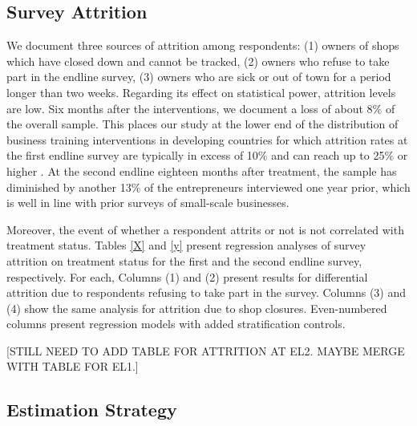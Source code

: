 \documentclass[11.5pt]{article}
\begin{document}
\subsection{Survey Attrition}

We document three sources of attrition among respondents: (1) owners of shops which have closed down and cannot be tracked, (2) owners who refuse to take part in the endline survey, (3) owners who are sick or out of town for a period longer than two weeks. Regarding its effect on statistical power, attrition levels are low. Six months after the interventions, we document a loss of about 8\% of the overall sample. This places our study at the lower end of the distribution of business training interventions in developing countries for which attrition rates at the first endline survey are typically in excess of 10\% and can reach up to 25\% or higher \citep[for a review, see][]{McKenzie2014}. At the second endline eighteen months after treatment, the sample has diminished by another 13\% of the entrepreneurs interviewed one year prior, which is well in line with prior surveys of small-scale businesses. %

Moreover, the event of whether a respondent attrits or not is not correlated with treatment status. Tables \ref{X} and \ref{y} present regression analyses of survey attrition on treatment status for the first and the second endline survey, respectively. For each, Columns (1) and (2) present results for differential attrition due to respondents refusing to take part in the survey. Columns (3) and (4) show the same analysis for attrition due to shop closures. Even-numbered columns present regression models with added stratification controls.

[\textcolor[rgb]{0.00,0.00,0.00}{STILL NEED TO ADD TABLE FOR ATTRITION AT EL2. MAYBE MERGE WITH TABLE FOR EL1.}]

\subsection{Estimation Strategy}

\end{document}
